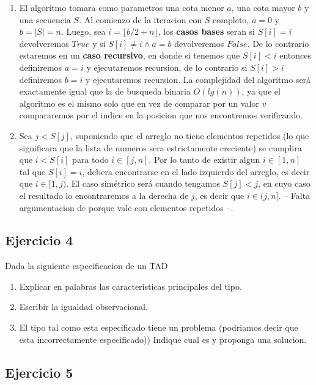 \documentclass[10pt, a4paper]{report}
\begin{document}
\begin{enumerate}
 \item El algoritmo tomara como parametros una cota menor $a$, una cota mayor $b$ y una secuencia $S$. Al comienzo de la iteracion con $S$ completo, $a=0$ y $b=|S|=n$. Luego, sea $i = \lfloor b/2+n \rfloor$, los \textbf{casos bases} seran si $S[i] = i$ devolveremos $True$ y si $S[i] \not= i \land a=b$ devolveremos $False$. De lo contrario estaremos en un \textbf{caso recursivo}, en donde si tenemos que $S[i] < i$ entonces definiremos $a=i$ y ejecutaremos recursion, de lo contrario si $S[i] > i$ definiremos $b=i$ y ejecutaremos recursion. La complejidad del algoritmo ser\'a exactamente igual que la de busqueda binaria $O(lg(n))$, ya que el algoritmo es el mismo solo que en vez de comparar por un valor $v$ compararemos por el indice en la posicion que nos encontremos verificando.
 
 \item Sea $j < S[j]$, suponiendo que el arreglo no tiene elementos repetidos (lo que significara que la lista de numeros sera estrictamente creciente) se cumplira que $i < S[i]$ para todo $i \in [j,n]$. Por lo tanto de existir algun $i \in [1,n]$ tal que $S[i]=i$, debera encontrarse en el lado izquierdo del arreglo, es decir que $i \in [1,j)$. El caso sim\'etrico ser\'a cuando tengamos $S[j] < j$, en cuyo caso el resultado lo encontraremos a la derecha de $j$, es decir que $i \in (j,n]$. -- {\color{red}Falta argumentacion de porque vale con elementos repetidos} --.
\end{enumerate}

\subsection*{Ejercicio 4}

Dada la siguiente especificacion de un TAD
\begin{enumerate}
 \item Explicar en palabras las caracteristicas principales del tipo.
 \item Escribir la igualdad observacional.
 \item El tipo tal como esta especificado tiene un problema (podriamos decir que esta incorrectamente especificado)) Indique cual es y proponga una solucion.
\end{enumerate}

\subsection*{Ejercicio 5}
\end{document}
